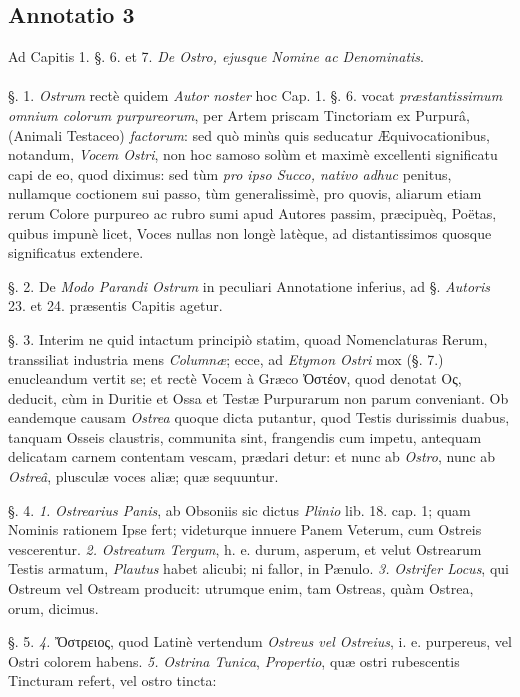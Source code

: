 \documentclass[a4paper, 11pt, oneside, polutonikogreek, german]{article}
\begin{document}
\subsection{Annotatio 3}
\begin{center}
Ad Capitis 1. §. 6. et 7. \emph{De Ostro, ejusque Nomine ac Denominatis}.
\end{center}
\paragraph{}
§. 1. \emph{Ostrum} rectè quidem \emph{Autor noster} hoc Cap. 1. §. 6. vocat \emph{præstantissimum omnium colorum purpureorum}, per Artem priscam Tinctoriam ex Purpurâ, (Animali Testaceo) \emph{factorum}: sed quò minùs quis seducatur Æquivocationibus, notandum, \emph{Vocem Ostri}, non hoc samoso solùm et maximè excellenti significatu capi de eo, quod diximus: sed tùm \emph{pro ipso Succo, nativo adhuc} penitus, nullamque coctionem sui passo, tùm generalissimè, pro quovis, aliarum etiam rerum Colore purpureo ac rubro sumi apud Autores passim, præcipuèq, Poëtas, quibus impunè licet, Voces nullas non longè latèque, ad distantissimos quosque significatus extendere.

§. 2. De \emph{Modo Parandi Ostrum} in peculiari Annotatione inferius, ad §. \emph{Autoris} 23. et 24. præsentis Capitis agetur.

§. 3. Interim ne quid intactum principiò statim, quoad Nomenclaturas Rerum, transsiliat industria mens \emph{Columnæ}; ecce, ad \emph{Etymon Ostri} mox (§. 7.) enucleandum vertit se; et rectè Vocem à Græco Ὀστέον, quod denotat Ος, deducit, cùm in Duritie et Ossa et Testæ Purpurarum non parum conveniant. Ob eandemque causam \emph{Ostrea} quoque dicta putantur, quod Testis durissimis duabus, tanquam Osseis claustris, communita sint, frangendis cum impetu, antequam delicatam carnem contentam vescam, prædari detur: et nunc ab \emph{Ostro}, nunc ab \emph{Ostreâ}, plusculæ voces aliæ; quæ sequuntur.

§. 4. \emph{1.} \emph{Ostrearius Panis}, ab Obsoniis sic dictus \emph{Plinio} lib. 18. cap. 1; quam Nominis rationem Ipse fert; videturque innuere Panem Veterum, cum Ostreis vescerentur. \emph{2.} \emph{Ostreatum Tergum}, h. e. durum, asperum, et velut Ostrearum Testis armatum, \emph{Plautus} habet alicubi; ni fallor, in Pænulo. \emph{3.} \emph{Ostrifer Locus}, qui Ostreum vel Ostream producit: utrumque enim, tam Ostreas, quàm Ostrea, orum, dicimus.

§. 5. \emph{4.} Ὄστρειος, quod Latinè vertendum \emph{Ostreus vel Ostreius}, i. e. purpereus, vel Ostri colorem habens. \emph{5.} \emph{Ostrina Tunica}, \emph{Propertio}, quæ ostri rubescentis Tincturam refert, vel ostro tincta:
\end{document}
